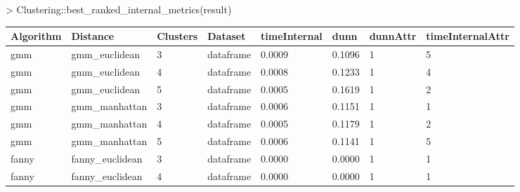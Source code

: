 \begin{Schunk}
\begin{Sinput}
> Clustering::best_ranked_internal_metrics(result)
\end{Sinput}
\end{Schunk}
{\small
\begin{longtable}{| p{1cm} | p{1.8cm} | p{0.9cm} | p{1.1cm} | p{1.6cm} | p{0.8cm} | p{1.3cm} | p{1.8cm} |}
\hline
\scriptsize  Algorithm & \scriptsize     Distance     & \scriptsize Clusters & \scriptsize  Dataset  & \scriptsize timeInternal & \scriptsize  dunn  & \scriptsize dunnAttr & \scriptsize timeInternalAttr \\
\hline
\scriptsize     gmm    & \scriptsize   gmm\_euclidean & \scriptsize    3     & \scriptsize dataframe & \scriptsize    0.0009    & \scriptsize 0.1096 & \scriptsize    1     & \scriptsize        5 \\
\scriptsize     gmm    & \scriptsize   gmm\_euclidean & \scriptsize    4     & \scriptsize dataframe & \scriptsize    0.0008    & \scriptsize 0.1233 & \scriptsize    1     & \scriptsize        4 \\
\scriptsize     gmm    & \scriptsize   gmm\_euclidean & \scriptsize    5     & \scriptsize dataframe & \scriptsize    0.0005    & \scriptsize 0.1619 & \scriptsize    1     & \scriptsize        2 \\
\cline{2-8}
\scriptsize     gmm    & \scriptsize   gmm\_manhattan & \scriptsize    3     & \scriptsize dataframe & \scriptsize    0.0006    & \scriptsize 0.1151 & \scriptsize    1     & \scriptsize        1 \\
\scriptsize     gmm    & \scriptsize   gmm\_manhattan & \scriptsize    4     & \scriptsize dataframe & \scriptsize    0.0005    & \scriptsize 0.1179 & \scriptsize    1     & \scriptsize        2 \\
\scriptsize     gmm    & \scriptsize   gmm\_manhattan & \scriptsize    5     & \scriptsize dataframe & \scriptsize    0.0006    & \scriptsize 0.1141 & \scriptsize    1     & \scriptsize        5 \\
\hline
\scriptsize   fanny    & \scriptsize fanny\_euclidean & \scriptsize    3     & \scriptsize dataframe & \scriptsize    0.0000    & \scriptsize 0.0000 & \scriptsize    1     & \scriptsize        1 \\
\scriptsize   fanny    & \scriptsize fanny\_euclidean & \scriptsize    4     & \scriptsize dataframe & \scriptsize    0.0000    & \scriptsize 0.0000 & \scriptsize    1     & \scriptsize        1 \\

\end{longtable}}
